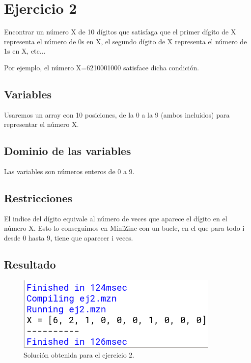\documentclass[11pt, spanish]{article}
\begin{document}
\section{Ejercicio 2}
Encontrar un número X de 10 dígitos que satisfaga que el primer dígito de X representa el número de 0s en X, el segundo dígito de X representa el número de 1s en X, etc...

Por ejemplo, el número X=6210001000 satisface dicha condición.

\subsection{Variables}

Usaremos un array con 10 posiciones, de la 0 a la 9 (ambos incluidos) para representar el número X.

\subsection{Dominio de las variables}

Las variables son números enteros de 0 a 9.

\subsection{Restricciones}

El indice del dígito equivale al número de veces que aparece el dígito en el número X. Esto lo conseguimos en MiniZinc con un bucle, en el que para todo i desde 0 hasta 9, tiene que aparecer i veces.

\subsection{Resultado}

\begin{figure}[H]
  \centering
      \includegraphics[scale = 0.50]{sol2.png}
 		 \caption{Solución obtenida para el ejercicio 2.}
  		\label{fig:ej2}

\end{figure}
\end{document}
